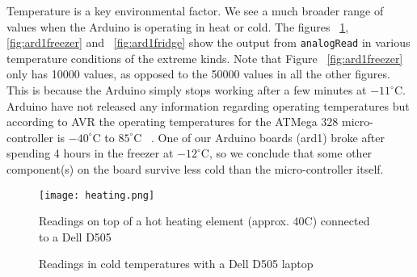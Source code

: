 \documentclass[a4paper]{article}           %
\begin{document}
Temperature is a key environmental factor. We see a much broader range of values when the Arduino is operating in heat or cold. The figures ~\ref{fig:ard1heat}, \ref{fig:ard1freezer} and ~\ref{fig:ard1fridge} show the output from \texttt{analogRead} in various temperature conditions of the extreme kinds. Note that Figure ~\ref{fig:ard1freezer} only has 10000 values, as opposed to the 50000 values in all the other figures. This is because the Arduino simply stops working after a few minutes at $-11^\circ$C. Arduino have not released any information regarding operating temperatures but according to AVR the operating temperatures for the ATMega 328 micro-controller is $-40^\circ$C to $85^\circ$C  ~\cite{atmegads}. One of our Arduino boards (ard1) broke after spending 4 hours in the freezer at $-12^\circ$C, so we conclude that some other component(s) on the board survive less cold than the micro-controller itself. 



\begin{figure}[h!]
  \centering  
  \texttt{[image: heating.png]}
  \caption{Readings on top of a hot heating element (approx. 40C) connected to a Dell D505}
  \label{fig:ard1heat}
\end{figure}

  

  \begin{figure}[h!]
    \centering  

    \caption{Readings in cold temperatures with a Dell D505 laptop}
    \label{fig:ardcold}
        
  \end{figure}
 
\end{document}
